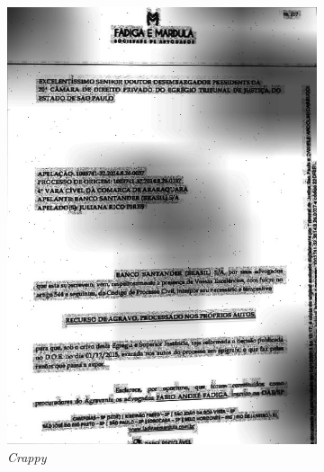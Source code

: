 \begin{figure}[H]
\begin{subfigure}[t]{.3\linewidth}
    \includegraphics[width=\textwidth]{figuras/991665_310196612_46_crappy.jpg}
    \caption{\textit{Crappy}}
  \end{subfigure}
  \begin{subfigure}[t]{.3\linewidth}

\end{subfigure}
\end{figure}
